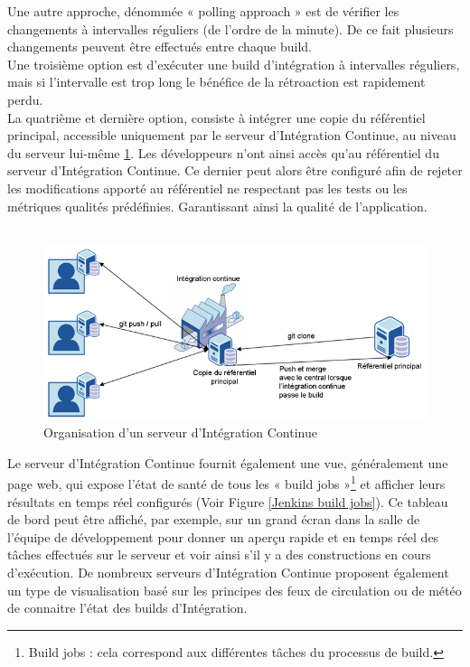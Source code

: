 \documentclass{report}
\begin{document}
      Une autre approche, dénommée « polling approach »  \cite{Duv07} est de vérifier les changements à intervalles réguliers (de l’ordre de la minute). De ce fait plusieurs changements peuvent être effectués entre chaque build.\\

      Une troisième option est d’exécuter une build d’intégration à intervalles réguliers, mais si l'intervalle est trop long le bénéfice de la rétroaction est rapidement perdu.\\

      La quatrième et dernière option, consiste à intégrer une copie du référentiel principal, accessible uniquement par le serveur d’Intégration Continue, au niveau du serveur lui-même \ref{IC server}. Les développeurs n’ont ainsi accès qu’au référentiel du serveur d’Intégration Continue. Ce dernier peut alors être configuré afin de rejeter les modifications apporté au référentiel ne respectant pas les tests ou les métriques qualités prédéfinies. Garantissant ainsi la qualité de l’application.\\\\

      \begin{figure}
        \begin{center}
          \includegraphics[scale=0.5]{images/ICServer.png}
        \end{center}
        \caption{Organisation d'un serveur d'Intégration Continue}
        \label{IC server}
      \end{figure}

      Le serveur d’Intégration Continue fournit également une vue, généralement une page web, qui expose l'état de santé de tous les « build jobs »\footnote{Build jobs : cela correspond aux différentes tâches du processus de build.} et afficher leurs résultats en temps réel  configurés (Voir Figure \ref{Jenkins build jobs}). Ce tableau de bord peut être affiché, par exemple, sur un grand écran dans la salle de l'équipe de développement pour donner un aperçu rapide et en temps réel des tâches effectués sur le serveur et voir ainsi s'il y a des constructions en cours d'exécution. De nombreux serveurs d’Intégration Continue proposent également un type de visualisation basé sur les principes des feux de circulation ou de météo de connaitre l’état des builds d’Intégration.\\
\end{document}
